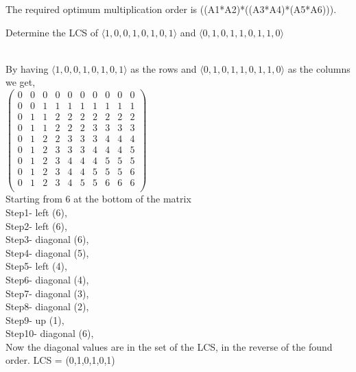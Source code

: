 \documentclass[addpoints,11pt]{exam}
\begin{document}
\begin{questions}
\begin{solutionorbox}
	The required optimum multiplication order is ((A1*A2)*((A3*A4)*(A5*A6))).

\end{solutionorbox}

\ifprintanswers
\newpage
\else
\bigskip
\fi

%
%
\question[5]
Determine the LCS of $\langle 1, 0, 0, 1, 0, 1, 0, 1 \rangle$ and $\langle 0, 1, 0, 1, 1, 0, 1, 1, 0 \rangle$
\begin{solutionorbox}
	\\
	By having $\langle 1, 0, 0, 1, 0, 1, 0, 1 \rangle$ as the rows and $\langle 0, 1, 0, 1, 1, 0, 1, 1, 0 \rangle$ as the columns we get,\\
	$\begin{pmatrix}
0&0&0&0&0&0&0&0&0&0\\
0&0&1&1&1&1&1&1&1&1\\
0&1&1&2&2&2&2&2&2&2\\
0&1&1&2&2&2&3&3&3&3\\
0&1&2&2&3&3&3&4&4&4\\
0&1&2&3&3&3&4&4&4&5\\
0&1&2&3&4&4&4&5&5&5\\
0&1&2&3&4&4&5&5&5&6\\
0&1&2&3&4&5&5&6&6&6\\
\end{pmatrix}$\\

Starting from 6 at the bottom of the matrix\\
Step1- left (6),\\
Step2- left (6), \\
Step3- diagonal (6),\\
Step4- diagonal (5),\\
Step5- left (4),\\
Step6- diagonal (4),\\
Step7- diagonal (3),\\
Step8- diagonal (2),\\
Step9- up (1),\\
Step10- diagonal (6),\\
Now the diagonal values are in the set of the LCS, in the reverse of the found order.
LCS = (0,1,0,1,0,1)
\end{solutionorbox}

\ifprintanswers
\newpage
\else
\bigskip
\fi




\end{questions}
\end{document}

